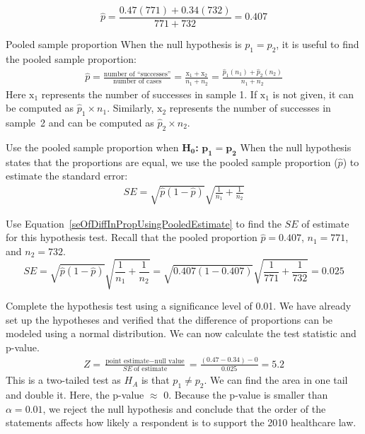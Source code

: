 $$\hat{p} =  \frac{0.47(771) + 0.34(732)}{771+732}= 0.407$$

\D{\newpage}

\begin{onebox}{Pooled sample proportion}
When the null hypothesis is $p_1 = p_2$, it is useful to find the pooled sample proportion:
\begin{eqnarray*}
\hat{p} = \frac{\text{number of ``successes''}}{\text{number of cases}} = \frac{\text{x}_1+\text{x}_2}{n_1+n_2}=\frac{\hat{p}_1(n_1) + \hat{p}_2(n_2)}{n_1 + n_2}
\end{eqnarray*}
Here $\text{x}_1$ represents the number of successes in sample 1. If $\text{x}_1$ is not given, it can be computed as $\hat{p}_1\times n_1$. Similarly, $\text{x}_2$ represents the number of successes in sample~2 and can be computed as $\hat{p}_2\times n_2$.
\end{onebox}

\begin{onebox}{Use the pooled sample proportion when $\mathbf{H_0}$\textbf{:} $\mathbf{p_1 = p_2}$}
When the null hypothesis states that the proportions are equal, we use the pooled sample proportion ($\hat{p}$) to estimate the standard error:
\begin{eqnarray}
SE =\sqrt{\hat{p}(1-\hat{p})}\sqrt{\frac{1}{n_1} + \frac{1}{n_2}}
\label{seOfDiffInPropUsingPooledEstimate}
\end{eqnarray}
\end{onebox}



\begin{examplewrap}
\begin{nexample}{Use Equation~\eqref{seOfDiffInPropUsingPooledEstimate} to find the $SE$ of estimate for this hypothesis test.  Recall that the pooled proportion $\hat{p}=0.407$, $n_1 = 771$, and $n_2=732$.}
$$SE =\sqrt{\hat{p}(1-\hat{p})}\sqrt{\frac{1}{n_1} + \frac{1}{n_2}}=\sqrt{0.407(1-0.407)}\sqrt{\frac{1}{771} + \frac{1}{732}}=0.025$$
\end{nexample}
\end{examplewrap}

\begin{examplewrap}
\begin{nexample}{Complete the hypothesis test using a significance level of 0.01.}
We have already set up the hypotheses and verified that the difference of proportions can be modeled using a normal distribution.  We can now calculate the test statistic and p-value.  
\begin{eqnarray*}
Z = \frac{\text{point estimate} - \text{null value}}{SE\ \text{of estimate}}= \frac{(0.47-0.34) - 0}{0.025} = 5.2
\end{eqnarray*}
This is a two-tailed test as $H_A$ is that $p_1\ne p_2$.  We can find the area in one tail and double it.  Here, the p-value $\approx$ 0.  Because the p-value is smaller than $\alpha = 0.01$, we reject the null hypothesis and conclude that the order of the statements affects how likely a respondent is to support the 2010 healthcare law.
\end{nexample}
\end{examplewrap}
 
